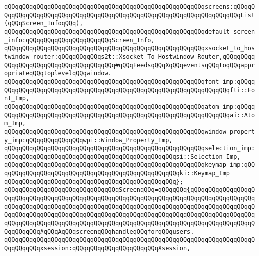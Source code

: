 \verb|qQQqqQQqqQQqqQQqqQQqqQQqqQQqqQQqqQQqqQQqqQQqqQQqqQQqqQQqscreens:qQQqqQQqqQQqqQQqqQQqqQQqqQQqqQQqqQQqqQQqqQQqqQQqqQQqqQQqqQQqqQQqqQQqqQQqList(qQQqScreen_InfoqQQq),|\newline
\newline
\verb|qQQqqQQqqQQqqQQqqQQqqQQqqQQqqQQqqQQqqQQqqQQqqQQqqQQqqQQqdefault_screen_info:qQQqqQQqqQQqqQQqqQQqqQQqScreen_Info,|\newline
\newline
\verb|qQQqqQQqqQQqqQQqqQQqqQQqqQQqqQQqqQQqqQQqqQQqqQQqqQQqqQQqxsocket_to_hostwindow_router:qQQqqQQqqQQqs2t::Xsocket_To_Hostwindow_Router,qQQqqQQqqQQqqQQqqQQqqQQqqQQqqQQqqQQqqQQq#qQQqFeedsqQQqXqQQqeventsqQQqtoqQQqappropriateqQQqtoplevelqQQqwindow.|\newline
\newline
\verb|qQQqqQQqqQQqqQQqqQQqqQQqqQQqqQQqqQQqqQQqqQQqqQQqqQQqqQQqfont_imp:qQQqqQQqqQQqqQQqqQQqqQQqqQQqqQQqqQQqqQQqqQQqqQQqqQQqqQQqqQQqqQQqqQQqfti::Font_Imp,|\newline
\verb|qQQqqQQqqQQqqQQqqQQqqQQqqQQqqQQqqQQqqQQqqQQqqQQqqQQqqQQqatom_imp:qQQqqQQqqQQqqQQqqQQqqQQqqQQqqQQqqQQqqQQqqQQqqQQqqQQqqQQqqQQqqQQqqQQqai::Atom_Imp,|\newline
\newline
\verb|qQQqqQQqqQQqqQQqqQQqqQQqqQQqqQQqqQQqqQQqqQQqqQQqqQQqqQQqwindow_property_imp:qQQqqQQqqQQqqQQqwpi::Window_Property_Imp,|\newline
\verb|qQQqqQQqqQQqqQQqqQQqqQQqqQQqqQQqqQQqqQQqqQQqqQQqqQQqqQQqselection_imp:qQQqqQQqqQQqqQQqqQQqqQQqqQQqqQQqqQQqqQQqqQQqqQQqsi::Selection_Imp,|\newline
\newline
\verb|qQQqqQQqqQQqqQQqqQQqqQQqqQQqqQQqqQQqqQQqqQQqqQQqqQQqqQQqkeymap_imp:qQQqqQQqqQQqqQQqqQQqqQQqqQQqqQQqqQQqqQQqqQQqqQQqqQQqki::Keymap_Imp|\newline
\verb|qQQqqQQqqQQqqQQqqQQqqQQqqQQqqQQqqQQqqQQqqQQqqQQq};|\newline
\newline
\verb|qQQqqQQqqQQqqQQqqQQqqQQqqQQqqQQqScreenqQQq=qQQqqQQq{qQQqqQQqqQQqqQQqqQQqqQQqqQQqqQQqqQQqqQQqqQQqqQQqqQQqqQQqqQQqqQQqqQQqqQQqqQQqqQQqqQQqqQQqqQQqqQQqqQQqqQQqqQQqqQQqqQQqqQQqqQQqqQQqqQQqqQQqqQQqqQQqqQQqqQQqqQQqqQQqqQQqqQQqqQQqqQQqqQQqqQQqqQQqqQQqqQQqqQQqqQQqqQQqqQQqqQQqqQQqqQQqqQQqqQQqqQQqqQQqqQQqqQQqqQQqqQQqqQQqqQQqqQQqqQQqqQQqqQQqqQQqqQQqqQQqqQQqqQQqqQQqqQQq#qQQqAqQQqscreenqQQqhandleqQQqforqQQqusers.|\newline
\verb|qQQqqQQqqQQqqQQqqQQqqQQqqQQqqQQqqQQqqQQqqQQqqQQqqQQqqQQqqQQqqQQqqQQqqQQqqQQqqQQqxsession:qQQqqQQqqQQqqQQqqQQqqQQqXsession,|\newline
